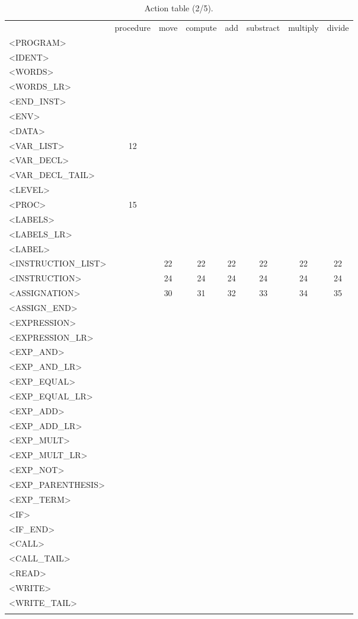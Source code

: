 \documentclass[a4paper,11pt]{article}
\begin{document}
\newpage
\begin{longtable}{l||ccccccc}
	& procedure & move & compute & add & substract & multiply & divide \\
	<PROGRAM> & & & & & & & \\
	<IDENT> & & & & & & & \\
	<WORDS> & & & & & & & \\
	<WORDS\_LR> & & & & & & & \\
	<END\_INST> & & & & & & & \\
	<ENV> & & & & & & & \\
	<DATA> & & & & & & & \\
	<VAR\_LIST> & 12 & & & & & & \\
	<VAR\_DECL> & & & & & & & \\
	<VAR\_DECL\_TAIL> & & & & & & & \\
	<LEVEL> & & & & & & & \\
	<PROC> & 15 & & & & & & \\
	<LABELS> & & & & & & & \\
	<LABELS\_LR> & & & & & & & \\
	<LABEL> & & & & & & & \\
	<INSTRUCTION\_LIST> & & 22 & 22 & 22 & 22 & 22 & 22 \\
	<INSTRUCTION> & & 24 & 24 & 24 & 24 & 24 & 24 \\
	<ASSIGNATION> & & 30 & 31 & 32 & 33 & 34 & 35 \\
	<ASSIGN\_END> & & & & & & & \\
	<EXPRESSION> & & & & & & & \\
	<EXPRESSION\_LR> & & & & & & & \\
	<EXP\_AND> & & & & & & & \\
	<EXP\_AND\_LR> & & & & & & & \\
	<EXP\_EQUAL> & & & & & & & \\
	<EXP\_EQUAL\_LR> & & & & & & & \\
	<EXP\_ADD> & & & & & & & \\
	<EXP\_ADD\_LR> & & & & & & & \\
	<EXP\_MULT> & & & & & & & \\
	<EXP\_MULT\_LR> & & & & & & & \\
	<EXP\_NOT> & & & & & & & \\
	<EXP\_PARENTHESIS> & & & & & & & \\
	<EXP\_TERM> & & & & & & & \\
	<IF> & & & & & & & \\
	<IF\_END> & & & & & & & \\
	<CALL> & & & & & & & \\
	<CALL\_TAIL> & & & & & & & \\
	<READ> & & & & & & & \\
	<WRITE> & & & & & & & \\
	<WRITE\_TAIL> & & & & & & & \\
	\caption{Action table (2/5).}
\end{longtable}
\end{document}
